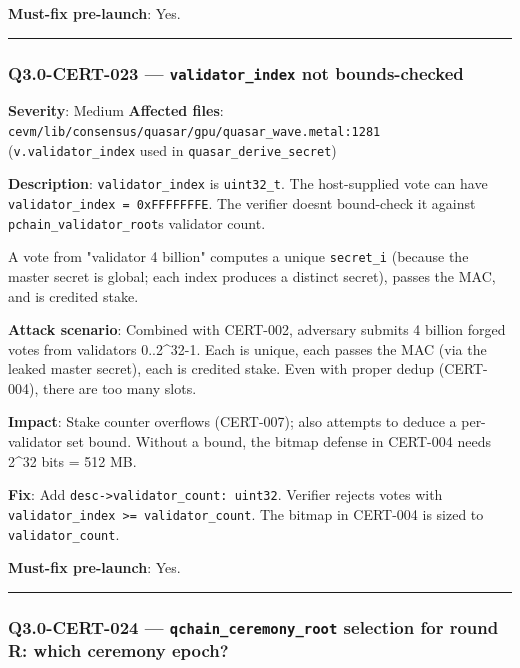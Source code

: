 \documentclass[
]{article}
\begin{document}
\textbf{Must-fix pre-launch}: Yes.

\begin{center}\rule{0.5\linewidth}{0.5pt}\end{center}

\subsubsection{\texorpdfstring{Q3.0-CERT-023 ---
\texttt{validator\_index} not
bounds-checked}{Q3.0-CERT-023 --- validator\_index not bounds-checked}}\label{q30-cert-023--validator_index-not-bounds-checked}

\textbf{Severity}: Medium \textbf{Affected files}:
\texttt{cevm/lib/consensus/quasar/gpu/quasar\_wave.metal:1281}
(\texttt{v.validator\_index} used in \texttt{quasar\_derive\_secret})

\textbf{Description}: \texttt{validator\_index} is \texttt{uint32\_t}.
The host-supplied vote can have
\texttt{validator\_index\ =\ 0xFFFFFFFE}. The verifier
doesn\textquotesingle t bound-check it against
\texttt{pchain\_validator\_root}\textquotesingle s validator count.

A vote from "validator 4 billion" computes a unique \texttt{secret\_i}
(because the master secret is global; each index produces a distinct
secret), passes the MAC, and is credited stake.

\textbf{Attack scenario}: Combined with CERT-002, adversary submits 4
billion forged votes from validators 0..2\^{}32-1. Each is unique, each
passes the MAC (via the leaked master secret), each is credited stake.
Even with proper dedup (CERT-004), there are too many slots.

\textbf{Impact}: Stake counter overflows (CERT-007); also attempts to
deduce a per-validator set bound. Without a bound, the bitmap defense in
CERT-004 needs 2\^{}32 bits = 512 MB.

\textbf{Fix}: Add \texttt{desc-\textgreater{}validator\_count:\ uint32}.
Verifier rejects votes with
\texttt{validator\_index\ \textgreater{}=\ validator\_count}. The bitmap
in CERT-004 is sized to \texttt{validator\_count}.

\textbf{Must-fix pre-launch}: Yes.

\begin{center}\rule{0.5\linewidth}{0.5pt}\end{center}

\subsubsection{\texorpdfstring{Q3.0-CERT-024 ---
\texttt{qchain\_ceremony\_root} selection for round R: which ceremony
epoch?}{Q3.0-CERT-024 --- qchain\_ceremony\_root selection for round R: which ceremony epoch?}}\label{q30-cert-024--qchain_ceremony_root-selection-for-round-r-which-ceremony-epoch}
\end{document}
